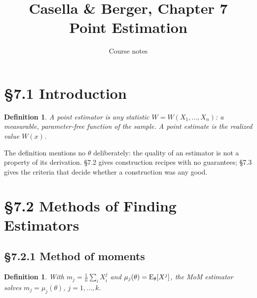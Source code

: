 \documentclass[11pt]{article}
\title{Casella \& Berger, Chapter 7\\[2pt]\large Point Estimation}
\author{Course notes}\date{}
\newtheorem{definition}[theorem]{Definition}
\begin{document}
\maketitle

\section{\S7.1 Introduction}
\begin{definition}
A \emph{point estimator} is any statistic $W=W(X_1,\dots,X_n)$: a measurable, parameter-free function of the sample. A point \emph{estimate} is the realized value $W(x)$.
\end{definition}
The definition mentions no $\theta$ deliberately: the quality of an estimator is not a property of its derivation. \S7.2 gives construction recipes with no guarantees; \S7.3 gives the criteria that decide whether a construction was any good.

\section{\S7.2 Methods of Finding Estimators}
\subsection{\S7.2.1 Method of moments}
\begin{definition}
With $m_j=\frac1n\sum_iX_i^j$ and $\mu_j(\theta)=\operatorname{E}_\theta[X^j]$, the MoM estimator solves $m_j=\mu_j(\theta)$, $j=1,\dots,k$.
\end{definition}
\end{document}
